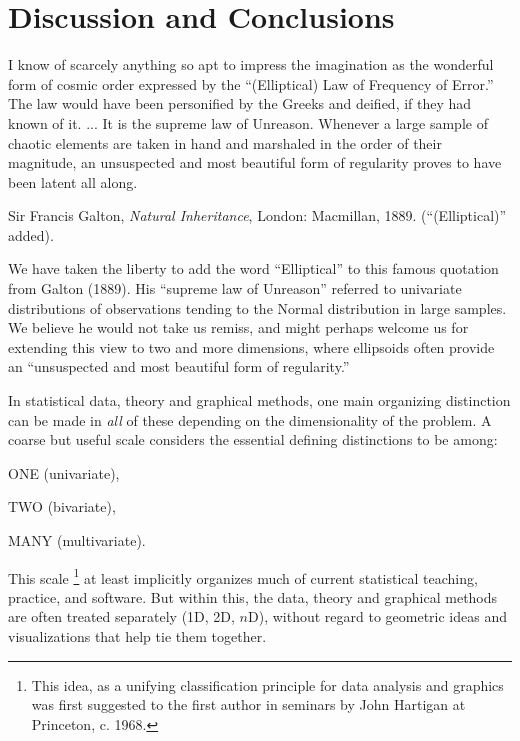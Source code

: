 \section{Discussion and Conclusions}

\epigraph{I know of scarcely anything so apt to impress the imagination as the
wonderful form of cosmic order expressed by the ``(Elliptical) Law of Frequency of
Error.'' 
The law would have been personified by the Greeks and deified, if they had known of it. 
... %
    It is the supreme law of Unreason. 
	Whenever a large sample of chaotic elements are taken in hand 
	and marshaled in the order of their magnitude, 
	an unsuspected and most beautiful form of regularity proves to have been
	latent all along.
}
{Sir Francis Galton, \emph{Natural Inheritance}, London: Macmillan, 1889.
(``(Elliptical)'' added).
}

We have taken the liberty to add the word ``Elliptical'' to this famous quotation from Galton (1889).
His ``supreme law of Unreason'' referred to univariate distributions of observations tending to the
Normal distribution in large samples.  We believe he would not take us remiss, and might perhaps
welcome us for extending this view to
two and more dimensions, where ellipsoids often provide 
an ``unsuspected and most beautiful form of regularity.''

In statistical data, theory and graphical methods, one main organizing
distinction can be made in \emph{all} 
of these depending
on the dimensionality of the problem.  A coarse but useful scale considers the essential defining
distinctions to be among:
\begin{itemize*}
 \item ONE (univariate), 
 \item TWO (bivariate), 
 \item MANY (multivariate).  
\end{itemize*}
This scale%
\footnote{
This idea, as a unifying classification principle for data analysis and graphics
was first suggested to the first author in
seminars by John Hartigan at Princeton, c. 1968.
}
at least implicitly organizes much of current statistical teaching, practice, and software.
But within this, the data, theory and graphical methods are often treated separately (1D, 2D, $n$D),
without regard to geometric ideas and visualizations that help tie them together.

